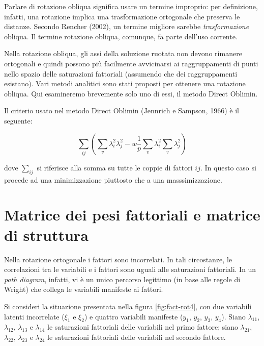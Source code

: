 \documentclass[
  11pt,
]{krantz}
\theoremstyle{definition}
\theoremstyle{definition}
\theoremstyle{definition}
\theoremstyle{definition}
\theoremstyle{remark}
\begin{document}
Parlare di rotazione obliqua significa usare un termine improprio: per definizione, infatti, una rotazione implica una trasformazione ortogonale che preserva le distanze. Secondo Rencher (2002), un termine migliore sarebbe \emph{trasformazione} obliqua. Il termine rotazione obliqua, comunque, fa parte dell'uso corrente.

Nella rotazione obliqua, gli assi della soluzione ruotata non devono rimanere ortogonali e quindi possono più facilmente avvicinarsi ai raggruppamenti di punti nello spazio delle saturazioni fattoriali (assumendo che dei raggruppamenti esistano). Vari metodi analitici sono stati proposti per ottenere una rotazione obliqua. Qui esamineremo brevemente solo uno di essi, il metodo Direct Oblimin.

Il criterio usato nel metodo Direct Oblimin (Jennrich e Sampson, 1966) è il seguente:

\[
\sum_{ij} \left(\sum_v \lambda_i^2 \lambda_j^2 - w \frac{1}{p} \sum_v \lambda_i^2
\sum_v \lambda_j^2\right)
\]

dove \(\sum_{ij}\) si riferisce alla somma su tutte le coppie di fattori \(ij\). In questo caso si procede ad una minimizzazione piuttosto che a una masssimizzazione.

\hypertarget{matrice-dei-pesi-fattoriali-e-matrice-di-struttura}{%
\section{Matrice dei pesi fattoriali e matrice di struttura}\label{matrice-dei-pesi-fattoriali-e-matrice-di-struttura}}

Nella rotazione ortogonale i fattori sono incorrelati. In tali circostanze, le correlazioni tra le variabili e i fattori sono uguali alle saturazioni fattoriali. In un \emph{path diagram}, infatti, vi è un unico percorso legittimo (in base alle regole di Wright) che collega le variabili manifeste ai fattori.

Si consideri la situazione presentata nella figura \ref{fig:fact-rot4}, con due variabili latenti incorrelate (\(\xi_1\) e \(\xi_2\)) e quattro variabili manifeste (\(y_1\), \(y_2\), \(y_3\), \(y_4\)). Siano \(\lambda_{11}\), \(\lambda_{12}\), \(\lambda_{13}\) e \(\lambda_{14}\) le saturazioni fattoriali delle variabili nel primo fattore; siano \(\lambda_{21}\), \(\lambda_{22}\), \(\lambda_{23}\) e \(\lambda_{24}\) le saturazioni fattoriali delle variabili nel secondo fattore.
\end{document}
